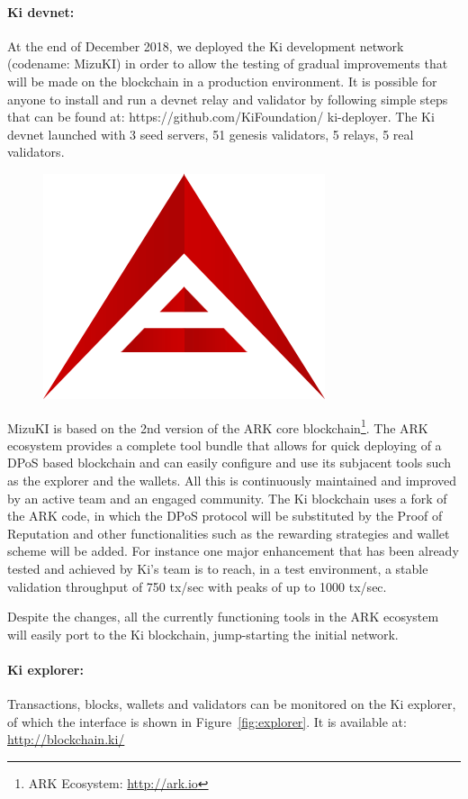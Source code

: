 \paragraph{Ki devnet:} At the end of December 2018, we deployed the Ki development network (codename: MizuKI) in order to allow the testing of gradual improvements that will be made on the blockchain in a production environment. It is possible for anyone to install and run a devnet relay and validator by following simple steps that can be found at: https://github.com/KiFoundation/ ki-deployer. The Ki devnet launched with 3 seed servers, 51 genesis validators, 5 relays, 5 real validators. 

\begin{figure}[!ht]
    \centering
	\includegraphics[width=0.3\linewidth, trim= 0cm 0cm 0cm 0cm, clip]{Whitepaper/Figures/ark.png}
	\label{fig:ark}
\end{figure}

MizuKI is based on the 2nd version of the ARK core blockchain\footnote{ARK Ecosystem: \url{http://ark.io}}. The ARK ecosystem provides a complete tool bundle that allows for quick deploying of a DPoS based blockchain and can easily configure and use its subjacent tools such as the explorer and the wallets. All this is continuously maintained and improved by an active team and an engaged community. The Ki blockchain uses a fork of the ARK code, in which the DPoS protocol will be substituted by the Proof of Reputation and other functionalities such as the rewarding strategies and wallet scheme will be added. For instance one major enhancement that has been already tested and achieved by Ki's team is to reach, in a test environment, a stable validation throughput of 750 tx/sec with peaks of up to 1000 tx/sec.  

Despite the changes, all the currently functioning tools in the ARK ecosystem will easily port to the Ki blockchain, jump-starting the initial network.

\paragraph{Ki explorer:} Transactions, blocks, wallets and validators can be monitored on the Ki explorer, of which the interface is shown in Figure~\ref{fig:explorer}. It is available at: \url{http://blockchain.ki/}

